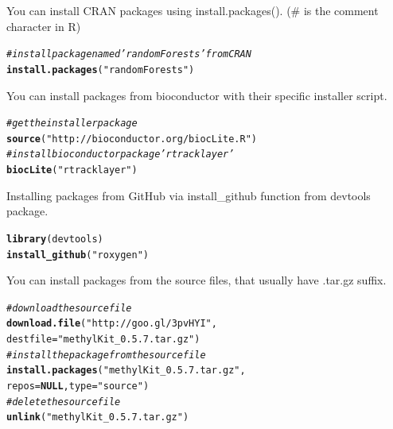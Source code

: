 \documentclass[english,nohyper]{tufte-book}\usepackage[]{graphicx}\usepackage[]{color}
\makeatletter
\newcommand{\hlstr}[1]{\textcolor[rgb]{0.192,0.494,0.8}{#1}}%
\newcommand{\hlcom}[1]{\textcolor[rgb]{0.678,0.584,0.686}{\textit{#1}}}%
\newcommand{\hlstd}[1]{\textcolor[rgb]{0.345,0.345,0.345}{#1}}%
\newcommand{\hlkwa}[1]{\textcolor[rgb]{0.161,0.373,0.58}{\textbf{#1}}}%
\newcommand{\hlkwc}[1]{\textcolor[rgb]{0.333,0.667,0.333}{#1}}%
\newcommand{\hlkwd}[1]{\textcolor[rgb]{0.737,0.353,0.396}{\textbf{#1}}}%
\newenvironment{kframe}{%
 \def\at@end@of@kframe{}%
 \ifinner\ifhmode%
  \def\at@end@of@kframe{\end{minipage}}%
  \begin{minipage}{\columnwidth}%
 \fi\fi%
 \def\FrameCommand##1{\hskip\@totalleftmargin \hskip-\fboxsep
 \colorbox{shadecolor}{##1}\hskip-\fboxsep
     \hskip-\linewidth \hskip-\@totalleftmargin \hskip\columnwidth}%
 \MakeFramed {\advance\hsize-\width
   \@totalleftmargin\z@ \linewidth\hsize
   \@setminipage}}%
 {\par\unskip\endMakeFramed%
 \at@end@of@kframe}
\newenvironment{knitrout}{}{} %
\makeatother
\begin{document}
You can install CRAN packages using install.packages(). (\# is the
comment character in R)

\begin{knitrout}
\color{fgcolor}\begin{kframe}
\begin{alltt}
\hlcom{# install package named 'randomForests' from CRAN}
\hlkwd{install.packages}\hlstd{(}\hlstr{"randomForests"}\hlstd{)}
\end{alltt}
\end{kframe}
\end{knitrout}


You can install packages from bioconductor with their specific installer
script.

\begin{knitrout}
\color{fgcolor}\begin{kframe}
\begin{alltt}
\hlcom{# get the installer package}
\hlkwd{source}\hlstd{(}\hlstr{"http://bioconductor.org/biocLite.R"}\hlstd{)}
\hlcom{# install bioconductor package 'rtracklayer'}
\hlkwd{biocLite}\hlstd{(}\hlstr{"rtracklayer"}\hlstd{)}
\end{alltt}
\end{kframe}
\end{knitrout}


Installing packages from GitHub via install\_github function from
devtools package.

\begin{knitrout}
\color{fgcolor}\begin{kframe}
\begin{alltt}
\hlkwd{library}\hlstd{(devtools)}
\hlkwd{install_github}\hlstd{(}\hlstr{"roxygen"}\hlstd{)}
\end{alltt}
\end{kframe}
\end{knitrout}


You can install packages from the source files, that usually have
.tar.gz suffix.

\begin{knitrout}
\color{fgcolor}\begin{kframe}
\begin{alltt}
\hlcom{# download the source file}
\hlkwd{download.file}\hlstd{(}\hlstr{"http://goo.gl/3pvHYI"}\hlstd{,}
               \hlkwc{destfile}\hlstd{=}\hlstr{"methylKit_0.5.7.tar.gz"}\hlstd{)}
\hlcom{# install the package from the source file}
\hlkwd{install.packages}\hlstd{(}\hlstr{"methylKit_0.5.7.tar.gz"}\hlstd{,}
                 \hlkwc{repos}\hlstd{=}\hlkwa{NULL}\hlstd{,}\hlkwc{type}\hlstd{=}\hlstr{"source"}\hlstd{)}
\hlcom{# delete the source file}
\hlkwd{unlink}\hlstd{(}\hlstr{"methylKit_0.5.7.tar.gz"}\hlstd{)}
\end{alltt}
\end{kframe}
\end{knitrout}
\end{document}
